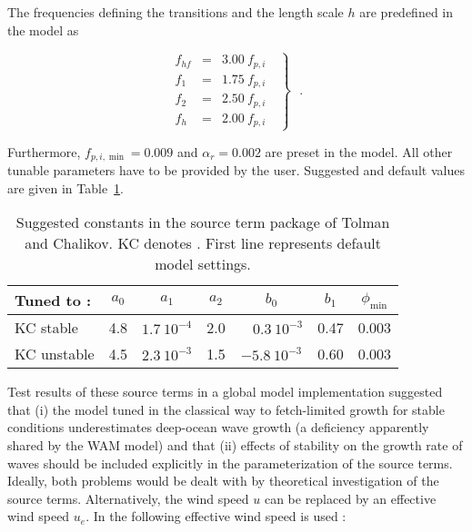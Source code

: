 The frequencies defining the transitions and the length scale $h$ are
predefined in the model as


\begin{equation} \left . \begin{array}{lll}
  f_{hf} & = & 3.00 \: f_{p,i}  \\
  f_1 & = & 1.75 \: f_{p,i}  \\
  f_2 & = & 2.50 \: f_{p,i}  \\
  f_h & = & 2.00 \: f_{p,i}
\end{array} \:\:\: \right \rbrace \:\:\: . \label{eq:TC_f} \end{equation}

\noindent
Furthermore, $f_{p,i,\min} = 0.009$ and $\alpha_r = 0.002$ are preset in the
model. All other tunable parameters have to be provided by the user. Suggested
and default values are given in Table~\ref{tab:TC_par}.


\begin{table} \begin{center}
\begin{tabular}{|l|c|c|c|c|c|c|} \hline \hline
Tuned to :  & $a_0$ &      $a_1$       & $a_2$ &
            $b_0$           & $b_1$  & $\phi_{\min} $\\ \hline
KC stable   &  4.8  & $1.7 \: 10^{-4}$ &  2.0  &
 $ \:\:\:\: 0.3 \: 10^{-3}$ &  0.47  &  0.003  \\
KC unstable &  4.5  & $2.3 \: 10^{-3}$ &  1.5  &
 $     -5.8 \: 10^{-3}$     &  0.60  &  0.003  \\ \hline \hline
\end{tabular} \end{center}
\caption{Suggested constants in the source term package of Tolman and
         Chalikov. KC denotes \cite{art:KC92,ibk:KC94}. First line represents
         default model settings.}
\label{tab:TC_par} \botline \end{table}

Test results of these source terms in a global model implementation
\citep{tol:OMB02a} suggested that (i) the model tuned in the classical way to
fetch-limited growth for stable conditions underestimates deep-ocean wave
growth (a deficiency apparently shared by the WAM model) and that (ii) effects
of stability on the growth rate of waves \citep{art:KC92,ibk:KC94} should be
included explicitly in the parameterization of the source terms.  Ideally,
both problems would be dealt with by theoretical investigation of the source
terms. Alternatively, the wind speed $u$ can be replaced by an effective wind
speed $u_e$. In \cite{tol:OMB02a} the following effective wind speed is used :

